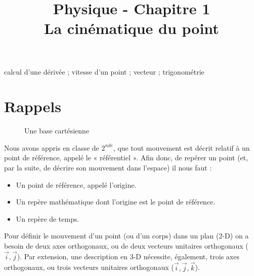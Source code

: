 \documentclass[11pt,a4paper]{article}
\title{\large Physique - Chapitre 1 \\ \LARGE La cinématique du point}
\date{}
\author{}
\begin{document}
\maketitle

\vspace{-1cm}

\begin{tcolorbox}[title=Notions de la classe de première à rappeler]
calcul d'une dérivée ; vitesse d'un point ; vecteur ; trigonométrie
\end{tcolorbox}
\tableofcontents
\section{Rappels}

\begingroup
\setlength{\columnsep}{5pt}%
\begin{figure}
    \centering
    \caption{Une base cartésienne}    
\end{figure}

Nous avons appris en classe de $2^{nde}$, que tout mouvement est décrit relatif à un point de référence, appelé le « référentiel ».  Afin donc, de repérer un point (et, par la suite, de décrire son mouvement dans l’espace) il nous faut :

\begin{itemize}
    \item Un point de référence, appelé l'origine. 
    \item Un repère mathématique dont l’origine est le point de référence.
    \item Un repère de temps. 
\end{itemize}

\endgroup

Pour définir le mouvement d’un point (ou d’un corps) dans un plan (2-D) on a besoin de deux axes orthogonaux, ou de deux vecteurs unitaires orthogonaux ($\Vec{i}, \Vec{j}$).  Par extension, une description en 3-D nécessite, également, trois axes orthogonaux, ou trois vecteurs unitaires orthogonaux ($\Vec{i}, \Vec{j}, \Vec{k}$).   
\end{document}

